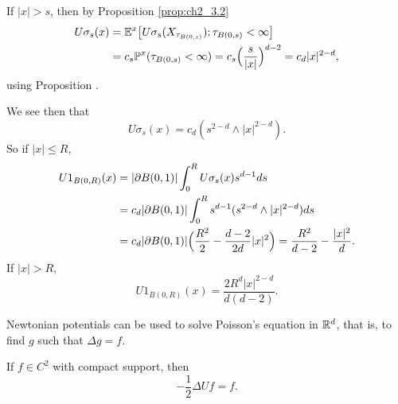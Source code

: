 If $|x| > s$, then by Proposition \ref{prop:ch2_3.2}
\begin{align*}
    U\sigma_s(x) &= \mathbb{E}^x\big[U\sigma_s(X_{\tau_{B(0,s)}}); \tau_{B(0,s)} < \infty\big] \\
    &= c_s\mathbb{P}^x(\tau_{B(0,s)} < \infty) = c_s\Big(\frac{s}{|x|}\Big)^{d-2} = c_d|x|^{2-d},
\end{align*}
using Proposition .

We see then that
\begin{equation}\label{eq:ch2_3.6}
    U\sigma_s(x) = c_d(s^{2-d} \wedge |x|^{2-d}).
\end{equation}
So if $|x| \leq R$,
\begin{align}\label{eq:ch2_3.7}
    U1_{B(0,R)}(x) &= |\partial B(0,1)| \int_0^R U\sigma_s(x)s^{d-1}ds \\
    &= c_d|\partial B(0,1)| \int_0^R s^{d-1}(s^{2-d} \wedge |x|^{2-d})ds \notag \\
    &= c_d|\partial B(0,1)|\Big(\frac{R^2}{2} - \frac{d-2}{2d}|x|^2\Big) = \frac{R^2}{d-2} - \frac{|x|^2}{d}. \notag
\end{align}
If $|x| > R$,
\begin{equation}\label{eq:ch2_3.8}
    U1_{B(0,R)}(x) = \frac{2R^d|x|^{2-d}}{d(d-2)}.
\end{equation}

Newtonian potentials can be used to solve Poisson's equation in $\mathbb{R}^d$, that is, to find $g$ such that $\Delta g = f$.

\begin{proposition}\label{prop:ch2_3.3}
If $f \in C^2$ with compact support, then
\[
    -\frac{1}{2}\Delta Uf = f.
\]
\end{proposition}

